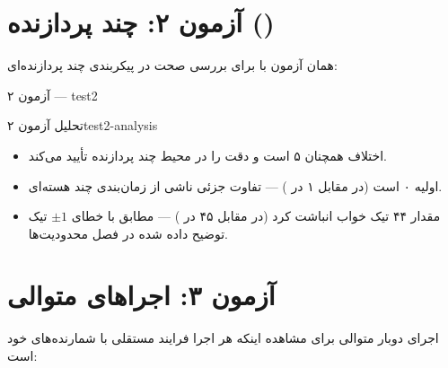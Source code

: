 \documentclass[code]{amznotes-fa}
\begin{document}
\section{آزمون ۲: چند پردازنده ()}

همان آزمون با  برای بررسی صحت در پیکربندی چند پردازنده‌ای:

\begin{codebox}{آزمون ۲ — }{test2}
\end{codebox}

\begin{exbox}{تحلیل آزمون ۲}{test2-analysis}
    \begin{itemize}[noitemsep]
        \item اختلاف  همچنان ۵ است و دقت  را در محیط چند پردازنده تأیید می‌کند.
        \item {} اولیه ۰ است (در مقابل ۱ در ) — تفاوت جزئی ناشی از زمان‌بندی چند هسته‌ای.
        \item {} مقدار ۴۴ تیک خواب انباشت کرد (در مقابل ۴۵ در ) — مطابق با خطای $$ تیک توضیح داده شده در فصل محدودیت‌ها.
    \end{itemize}
\end{exbox}

\section{آزمون ۳: اجراهای متوالی}

اجرای دوبار متوالی  برای مشاهده اینکه هر اجرا فرایند مستقلی با شمارنده‌های خود است:
\end{document}
